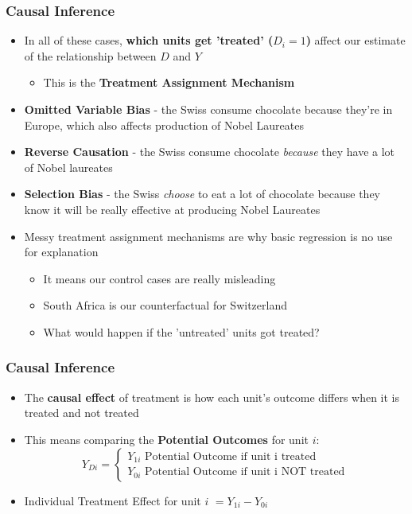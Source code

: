 \documentclass[xcolor=x11names,compress]{beamer}\usepackage[]{graphicx}\usepackage[]{color}
\renewcommand{\(}{\begin{columns}}
\renewcommand{\)}{\end{columns}}
\newcommand{\<}[1]{\begin{column}{#1}}
\renewcommand{\>}{\end{column}}
\begin{document}
\begin{frame}
\frametitle{Causal Inference}
\begin{itemize}
\item In all of these cases, \textbf{which units get 'treated' ($D_i=1$)} affect our estimate of the relationship between $D$ and $Y$
\pause
\begin{itemize}
\item This is the \textbf{Treatment Assignment Mechanism}
\pause
\end{itemize}
\item \textbf{Omitted Variable Bias} - the Swiss consume chocolate because they're in Europe, which also affects production of Nobel Laureates
\pause
\item \textbf{Reverse Causation} - the Swiss consume chocolate \textit{because} they have a lot of Nobel laureates
\pause
\item \textbf{Selection Bias} - the Swiss \textit{choose} to eat a lot of chocolate because they know it will be really effective at producing Nobel Laureates
\pause
\item Messy treatment assignment mechanisms are why basic regression is no use for explanation
\begin{itemize}
\item It means our control cases are really misleading
\item South Africa is our counterfactual for Switzerland
\item What would happen if the 'untreated' units got treated?
\end{itemize}
\end{itemize}
\end{frame}

\begin{frame}
\frametitle{Causal Inference}
\begin{itemize}
\item The \textbf{causal effect} of treatment is how each unit's outcome differs when it is treated and not treated
\pause
\item This means comparing the \textbf{Potential Outcomes} for unit $i$:
\[
Y_{Di} = 
\begin{cases}
Y_{1i}\text{   Potential Outcome if unit i treated} \\
Y_{0i}\text{   Potential Outcome if unit i NOT treated}
\end{cases}
\]
\item Individual Treatment Effect for unit $i$ $ = Y_{1i} - Y_{0i}$
\end{itemize}
\end{frame}
\end{document}
